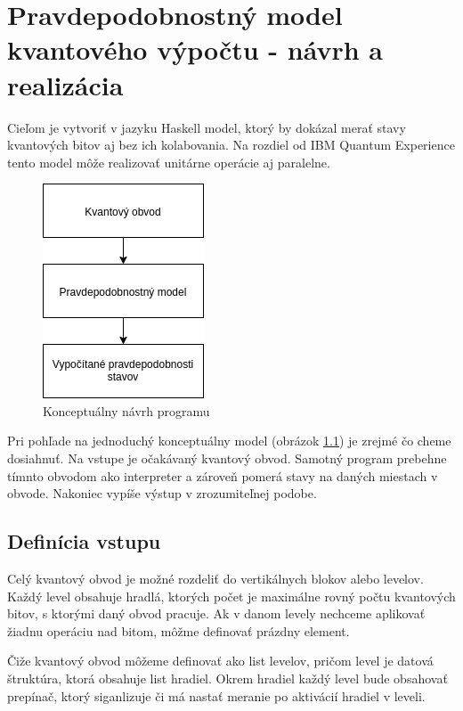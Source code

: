
\chapter{Pravdepodobnostný model kvantového výpočtu - návrh a realizácia}

Cieľom je vytvoriť v jazyku Haskell model, ktorý by dokázal merať stavy
kvantových bitov aj bez ich kolabovania. Na rozdiel od IBM Quantum
Experience tento model môže realizovať unitárne operácie aj paralelne.

\begin{figure}
	\centering 
	\includegraphics[width=.2\textwidth]{figures/navrh.png} 
	\caption{Konceptuálny návrh programu}
    \label{navrh}
\end{figure}


Pri pohľade na jednoduchý konceptuálny model (obrázok \ref{navrh}) je zrejmé
čo cheme dosiahnuť. Na vstupe je očakávaný kvantový obvod. Samotný program
prebehne tímnto obvodom ako interpreter a zároveň pomerá stavy na daných
miestach v obvode. Nakoniec vypíše výstup v zrozumiteľnej podobe.

\section{Definícia vstupu}

Celý kvantový obvod je možné rozdeliť do vertikálnych blokov alebo levelov.
Každý level obsahuje hradlá, ktorých počet je maximálne rovný počtu 
kvantových bitov, s ktorými daný obvod pracuje. Ak v danom levely nechceme
aplikovať žiadnu operáciu nad bitom, môžme definovať prázdny element.

Čiže kvantový obvod môžeme definovať ako list levelov, pričom level je datová
štruktúra, ktorá obsahuje list hradiel. Okrem hradiel každý level bude
obsahovať prepínač, ktorý siganlizuje či má nastať meranie po aktivácií 
hradiel v leveli.
